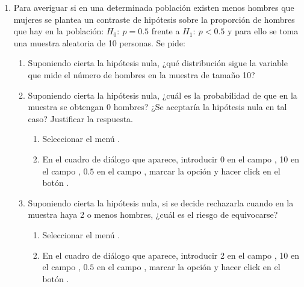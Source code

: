 \begin{enumerate}[leftmargin=*]
\item Para averiguar si en una determinada población existen menos hombres que mujeres se plantea un contraste de
hipótesis sobre la proporción de hombres que hay en la población: $H_0:\ p=0.5$ frente a $H_1:\ p<0.5$ y para ello se
toma una muestra aleatoria de 10 personas. 
Se pide:
\begin{enumerate}
\item Suponiendo cierta la hipótesis nula, ¿qué distribución sigue la variable que mide el número de hombres en la
muestra de tamaño 10?
\item Suponiendo cierta la hipótesis nula, ¿cuál es la probabilidad de que en la muestra se obtengan 0 hombres?
¿Se aceptaría la hipótesis nula en tal caso? 
Justificar la respuesta.
\begin{indicacion}
\begin{enumerate}
\item Seleccionar el menú .
\item En el cuadro de diálogo que aparece, introducir 0 en el campo , 10 en el campo
, $0.5$ en el campo , marcar la opción  y
hacer click en el botón .
\end{enumerate}
\end{indicacion}

\item Suponiendo cierta la hipótesis nula, si se decide rechazarla cuando en la muestra haya 2 o menos hombres, ¿cuál es
el riesgo de equivocarse?
\begin{indicacion}
\begin{enumerate}
\item Seleccionar el menú .
\item En el cuadro de diálogo que aparece, introducir 2 en el campo , 10 en el campo
, $0.5$ en el campo , marcar la opción  y
hacer click en el botón .
\end{enumerate}
\end{indicacion}


\end{enumerate}
\end{enumerate}
